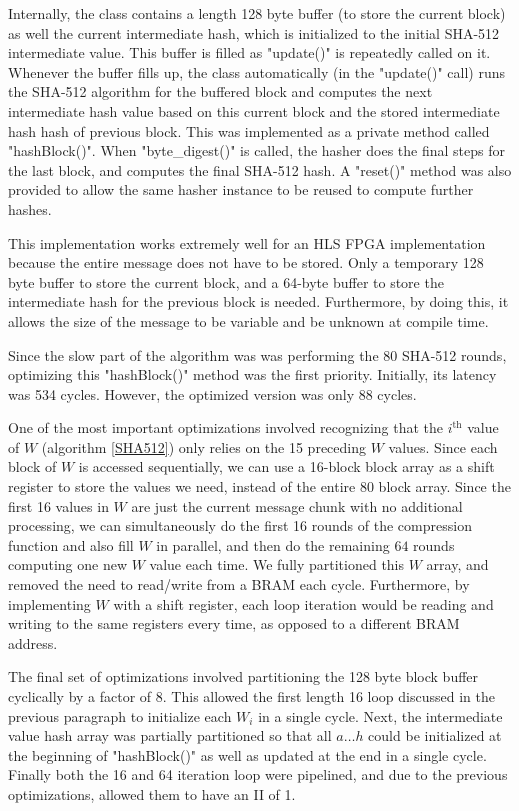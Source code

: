 Internally, the class contains a length 128 byte buffer (to store the current block)
as well the current intermediate hash,
which is initialized to the initial SHA-512 intermediate value. This buffer is filled as
"update()" is repeatedly called on it. Whenever the buffer fills up, the class
automatically (in the "update()" call) runs the SHA-512 algorithm for the buffered block
and computes the next intermediate hash value based on this current block and the stored intermediate hash hash of previous block.
This was implemented as a private method called "hashBlock()".
When "byte_digest()" is called, the hasher does the final steps for the last block,
and computes the final SHA-512 hash. A "reset()" method was also provided to allow the same hasher
instance to be reused to compute further hashes.

This implementation works extremely well for an HLS FPGA implementation because
the entire message does not have to be stored. Only a temporary 128 byte buffer
to store the current block, and a 64-byte buffer to store the intermediate hash for the previous block is needed.
Furthermore, by doing this, it allows the size of the message to be variable and be unknown at compile time.

Since the slow part of the algorithm was was performing the 80 SHA-512 rounds,
optimizing this "hashBlock()" method was the first priority. Initially, its
latency was 534 cycles. However, the optimized version was only 88 cycles.

One of the most important optimizations
involved recognizing that the $i^{\text{th}}$ value of $W$ (algorithm \ref{SHA512}) only relies on the 15 preceding $W$ values.
Since each block of $W$ is accessed sequentially, we can use a 16-block block array as a shift register
to store the values we need, instead of the entire 80 block array. Since the first 16 values in $W$ are
just the current message chunk with no additional processing, we can simultaneously do the first 16
rounds of the compression function and also fill $W$ in parallel, and then do the remaining $64$ rounds
computing one new $W$ value each time. We fully partitioned this $W$ array, and removed the need
to read/write from a BRAM each cycle. Furthermore, by implementing $W$ with a shift register,
each loop iteration would be reading and writing to the same registers every time,
as opposed to a different BRAM address.

The final set of optimizations involved partitioning the 128 byte block buffer
cyclically by a factor of 8. This allowed the first length 16 loop discussed
in the previous paragraph to initialize each $W_i$ in a single cycle. Next, the
intermediate value hash array was partially partitioned so that all $a \ldots h$ could
be initialized at the beginning of "hashBlock()" as well as updated
at the end in a single cycle. Finally both the 16 and 64 iteration loop were
pipelined, and due to the previous optimizations, allowed them to have an II of 1.

